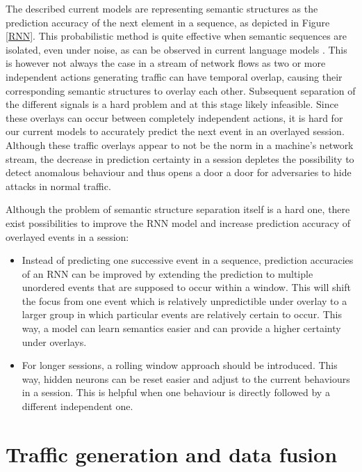 \documentclass[a4paper,12pt,twoside]{report}
\begin{document}
The described current models are representing semantic structures as the prediction accuracy of the next element in a sequence, as depicted in Figure \ref{RNN}. This probabilistic method is quite effective when semantic sequences are isolated, even under noise, as can be observed in current language models \cite{shi2012towards}. This is however not always the case in a stream of network flows as two or more independent actions generating traffic can have temporal overlap, causing their corresponding semantic structures to overlay each other. Subsequent separation of the different signals is a hard problem and at this stage likely infeasible. Since these overlays can occur between completely independent actions, it is hard for our current models to accurately predict the next event in an overlayed session. Although these traffic overlays appear to not be the norm in a machine's network stream, the decrease in prediction certainty in a session depletes the possibility to detect anomalous behaviour and thus opens a door a door for adversaries to hide attacks in normal traffic. 

Although the problem of semantic structure separation itself is a hard one, there exist possibilities to improve the RNN model and increase prediction accuracy of overlayed events in a session:

\begin{itemize}
\item Instead of predicting one successive event in a sequence, prediction accuracies of an RNN can be improved by extending the prediction to multiple unordered events that are supposed to occur within a window. This will shift the focus from one event which is relatively unpredictible under overlay to a larger group in which particular events are relatively certain to occur. This way, a model can learn semantics easier and can provide a higher certainty under overlays.
\item  For longer sessions, a rolling window approach should be introduced. This way, hidden neurons can be reset easier and adjust to the current behaviours in a session. This is helpful when one behaviour is directly followed by a different independent one.
\end{itemize}





\section{Traffic generation and data fusion}
\end{document}
